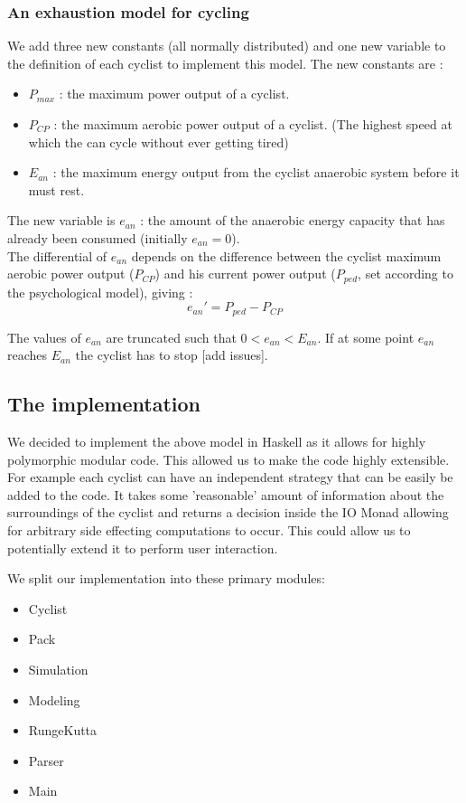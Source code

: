 \documentclass[10pt, a4paper]{report}
\begin{document}
\subsubsection{An exhaustion model for cycling}

We add three new constants (all normally distributed) and one new variable to the definition of each cyclist to implement this model. The new constants are :
\begin{itemize}
\item $P_{max}$ : the maximum power output of a cyclist.
\item $P_{CP}$ : the maximum aerobic power output of a cyclist. (The highest speed at which the can cycle without ever getting tired)
\item $E_{an}$ : the maximum energy output from the cyclist anaerobic system before it must rest.
\end{itemize}
The new variable is $e_{an}$ : the amount of the anaerobic energy capacity that has already been consumed (initially $e_{an} = 0$). \\

The differential of $e_{an}$ depends on the difference between the cyclist maximum aerobic power output ($P_{CP}$) and his current power output ($P_{ped}$, set according to the psychological model), giving :
$$ e_{an}' = P_{ped} - P_{CP} $$

The values of $e_{an}$ are truncated such that $0 < e_{an} < E_{an}$. If at some point $e_{an}$ reaches $E_{an}$ the cyclist has to stop [add issues].

\subsection{The implementation}\label{subsec:impl}

We decided to implement the above model in Haskell as it allows for highly polymorphic modular code. This allowed us to make the code highly extensible. For example each cyclist can have an independent strategy that can be easily be added to the code. It takes some 'reasonable' amount of information about the surroundings of the cyclist and returns a decision inside the IO Monad allowing for arbitrary side effecting computations to occur. This could allow us to potentially extend it to perform user interaction. \par

We split our implementation into these primary modules:
\begin{itemize}
\item Cyclist
\item Pack
\item Simulation
\item Modeling
\item RungeKutta
\item Parser
\item Main
\end{itemize}
\end{document}
